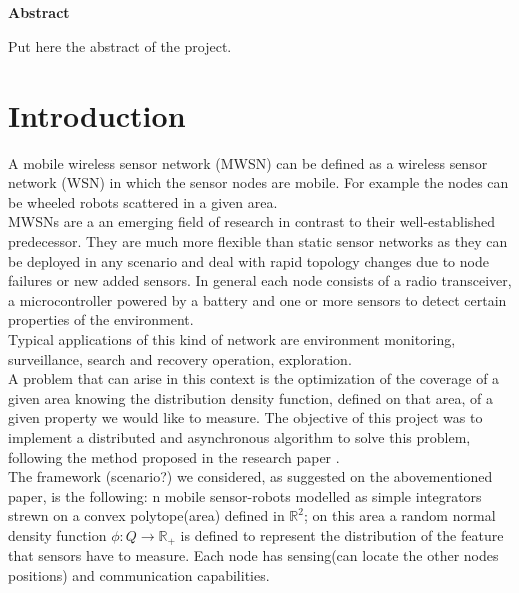 \documentclass[a4paper,11pt,oneside]{book}
\begin{document}
\newpage
\thispagestyle{empty}

\begin{center}
\chapter*{}
\thispagestyle{empty}
{\Huge \textbf{Abstract}}\\
\vspace{15mm}
\end{center}
Put here the abstract of the project. 


\tableofcontents \thispagestyle{empty}
\listoffigures\thispagestyle{empty}

\chapter*{Introduction}
A mobile wireless sensor network (MWSN) can be defined as a wireless sensor network (WSN) in which the sensor nodes are mobile. For example the nodes can be wheeled robots scattered in a given area.\\MWSNs are a an emerging field of research in contrast to their well-established predecessor. They are much more flexible than static sensor networks as they can be deployed in any scenario and deal with rapid topology changes due to node failures or new added sensors. In general each node consists of a radio transceiver, a microcontroller powered by a battery and one or more sensors to detect certain properties of the environment.\\
Typical applications of this kind of network are environment monitoring, surveillance, search and recovery operation, exploration.\\
A problem that can arise in this context is the optimization of the coverage of a given area knowing the distribution density function, defined on that area, of a given property we would like to measure. The objective of this project was to implement a distributed and asynchronous algorithm to solve this problem, following the method proposed in the research paper \cite{MR-GB:11}.\\
The framework (scenario?) we considered, as suggested on the abovementioned paper, is the following: n mobile sensor-robots modelled as simple integrators strewn on a convex polytope(area) defined in $\mathbb{R}^2$; on this area a random normal density function $\phi:Q\rightarrow \mathbb{R}_+$ is defined to represent the distribution of the feature that sensors have to measure. Each node has sensing(can locate the other nodes positions) and communication capabilities.  
\end{document}
